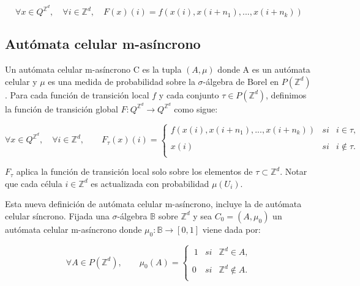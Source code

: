 \documentclass[../proyecto.tex]{memoir}
\begin{document}
\begin{equation*}
\forall x \in Q^{\mathds{Z}^{d}}, \quad \forall i \in \mathds{Z}^{d}, \quad F(x)(i) = f(x(i),x(i+n_{1}),...,x(i+n_{k}))
\end{equation*}

\subsection{Autómata celular m-asíncrono}

Un autómata celular m-asíncrono C es la tupla $(A, \mu)$ donde A es un autómata celular y $\mu$ es una medida de probabilidad sobre la $\sigma$-álgebra de Borel en $P(\mathds{Z}^{d})$. 
Para cada función de transición local $f$ y cada conjunto $\tau \in P(\mathds{Z}^{d})$, definimos la función de transición global $F:Q^{\mathds{Z}^{d}} \rightarrow Q^{\mathds{Z}^{d}}$ como sigue:

\begin{equation*}
	\forall x \in Q^{\mathds{Z}^{d}}, \quad \forall i \in \mathds{Z}^{d}, \qquad
	F_{\tau}(x)(i) = \left\{ \begin{array}{lcc}
             f(x(i),x(i+n_{1}),...,x(i+n_{k})) &   si  & i \in \tau ,\\
             \\ x(i) & si  & i \notin \tau .\\
             \end{array}
             \right.
\end{equation*}

$F_{\tau}$ aplica la función de transición local solo sobre los elementos de $\tau \subset \mathds{Z}^{d}$. Notar que cada célula $i \in \mathds{Z}^{d}$ es actualizada con probabilidad $\mu(U_{i})$.

Esta nueva definición de autómata celular m-asíncrono, incluye la de autómata celular síncrono. Fijada una $\sigma$-álgebra $\mathds{B}$ sobre $\mathds{Z}^{d}$ y sea $C_{0}=(A, \mu_{0})$ un autómata celular m-asíncrono donde $\mu_{0}: \mathds{B} \rightarrow [0,1]$ viene dada por: 

\begin{equation*}
	 \forall A \in P(\mathds{Z}^{d}), \qquad 
	 \mu_{0}(A) = \left\{ \begin{array}{lcc}
             \ 1 &   si  & \mathds{Z}^{d} \in A ,\\
             \\0 &   si  & \mathds{Z}^{d} \notin A .\\
             \end{array}
             \right.
\end{equation*}
\end{document}
